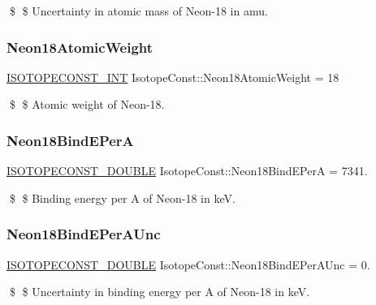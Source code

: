 \$ \$ Uncertainty in atomic mass of Neon-\/18 in amu. \mbox{\label{group___isotope_const-_neon-_ne18_gab7f78c9ba7a26a94347ca7ae216be411}} 
\subsubsection{\texorpdfstring{Neon18\+Atomic\+Weight}{Neon18AtomicWeight}}
{\footnotesize\ttfamily \mbox{\hyperlink{group___isotope_const-_macros_ga5f18360b3e99483a35c32d789e62621c}{I\+S\+O\+T\+O\+P\+E\+C\+O\+N\+S\+T\+\_\+\+I\+NT}} Isotope\+Const\+::\+Neon18\+Atomic\+Weight = 18}

\$ \$ Atomic weight of Neon-\/18. \mbox{\label{group___isotope_const-_neon-_ne18_gaf00bb9aa668c3c52b97cb6218f053f4d}} 
\subsubsection{\texorpdfstring{Neon18\+Bind\+E\+PerA}{Neon18BindEPerA}}
{\footnotesize\ttfamily \mbox{\hyperlink{group___isotope_const-_macros_ga8f45a7272ce02c0b4c65c44636ed719a}{I\+S\+O\+T\+O\+P\+E\+C\+O\+N\+S\+T\+\_\+\+D\+O\+U\+B\+LE}} Isotope\+Const\+::\+Neon18\+Bind\+E\+PerA = 7341.}

\$ \$ Binding energy per A of Neon-\/18 in keV. \mbox{\label{group___isotope_const-_neon-_ne18_gaf2b6cedc33a25ecfe31d34a7003ce908}} 
\subsubsection{\texorpdfstring{Neon18\+Bind\+E\+Per\+A\+Unc}{Neon18BindEPerAUnc}}
{\footnotesize\ttfamily \mbox{\hyperlink{group___isotope_const-_macros_ga8f45a7272ce02c0b4c65c44636ed719a}{I\+S\+O\+T\+O\+P\+E\+C\+O\+N\+S\+T\+\_\+\+D\+O\+U\+B\+LE}} Isotope\+Const\+::\+Neon18\+Bind\+E\+Per\+A\+Unc = 0.}

\$ \$ Uncertainty in binding energy per A of Neon-\/18 in keV. \mbox{\label{group___isotope_const-_neon-_ne18_ga85b3663a8c1d630b50f29c98abf94805}} 
